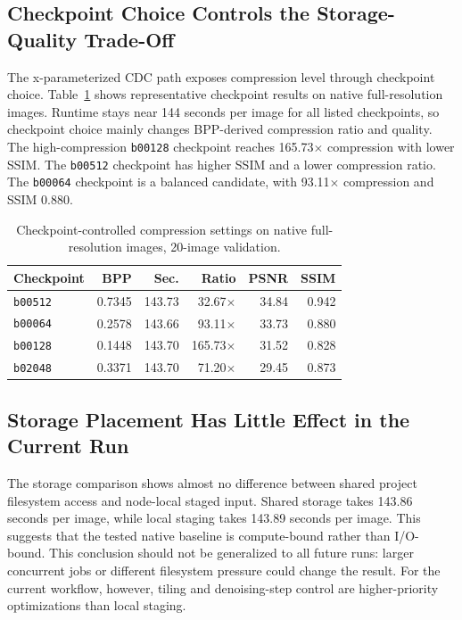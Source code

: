 \documentclass[conference]{IEEEtran}
\begin{document}
\subsection{Checkpoint Choice Controls the Storage-Quality Trade-Off}

The x-parameterized CDC path exposes compression level through checkpoint choice. Table~\ref{tab:checkpoints} shows representative checkpoint results on native full-resolution images. Runtime stays near 144 seconds per image for all listed checkpoints, so checkpoint choice mainly changes BPP-derived compression ratio and quality. The high-compression \texttt{b00128} checkpoint reaches 165.73$\times$ compression with lower SSIM. The \texttt{b00512} checkpoint has higher SSIM and a lower compression ratio. The \texttt{b00064} checkpoint is a balanced candidate, with 93.11$\times$ compression and SSIM 0.880.

\begin{table}[t]
\caption{Checkpoint-controlled compression settings on native full-resolution images, 20-image validation.}
\label{tab:checkpoints}
\centering
\begin{tabular}{lrrrrr}
\toprule
Checkpoint & BPP & Sec. & Ratio & PSNR & SSIM\\
\midrule
\texttt{b00512} & 0.7345 & 143.73 & 32.67$\times$ & 34.84 & 0.942\\
\texttt{b00064} & 0.2578 & 143.66 & 93.11$\times$ & 33.73 & 0.880\\
\texttt{b00128} & 0.1448 & 143.70 & 165.73$\times$ & 31.52 & 0.828\\
\texttt{b02048} & 0.3371 & 143.70 & 71.20$\times$ & 29.45 & 0.873\\
\bottomrule
\end{tabular}
\end{table}

\subsection{Storage Placement Has Little Effect in the Current Run}

The storage comparison shows almost no difference between shared project filesystem access and node-local staged input. Shared storage takes 143.86 seconds per image, while local staging takes 143.89 seconds per image. This suggests that the tested native baseline is compute-bound rather than I/O-bound. This conclusion should not be generalized to all future runs: larger concurrent jobs or different filesystem pressure could change the result. For the current workflow, however, tiling and denoising-step control are higher-priority optimizations than local staging.
\end{document}
